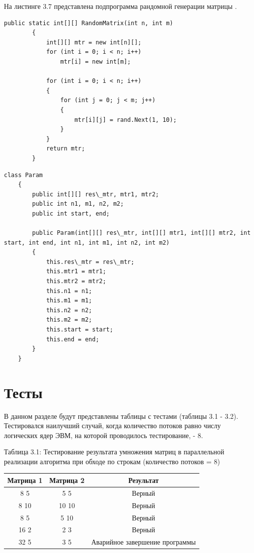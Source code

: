 \documentclass[12pt]{report}
\begin{document}
На листинге 3.7 представлена подпрограмма рандомной генерации матрицы .

\begin{lstlisting}[label=some-code,caption=Подпрограмма создания матрицы с использованием метода Next класса Random \cite{Rand}]
public static int[][] RandomMatrix(int n, int m)
        {
            int[][] mtr = new int[n][];
            for (int i = 0; i < n; i++)
                mtr[i] = new int[m];
          
            for (int i = 0; i < n; i++)
            {
                for (int j = 0; j < m; j++)
                {
                    mtr[i][j] = rand.Next(1, 10);
                }
            }
            return mtr;
        }
\end{lstlisting}

\begin{lstlisting}[label=some-code,caption=класс Param]
class Param
    {
        public int[][] res\_mtr, mtr1, mtr2;
        public int n1, m1, n2, m2;
        public int start, end;

        public Param(int[][] res\_mtr, int[][] mtr1, int[][] mtr2, int start, int end, int n1, int m1, int n2, int m2)
        {
            this.res\_mtr = res\_mtr;
            this.mtr1 = mtr1;
            this.mtr2 = mtr2;
            this.n1 = n1;
            this.m1 = m1;
            this.n2 = n2;
            this.m2 = m2;
            this.start = start;
            this.end = end;
        }
    }
\end{lstlisting}


\section{Тесты}

В данном разделе будут представлены таблицы с тестами (таблицы 3.1 - 3.2). Тестировался наилучший случай, когда количество потоков равно числу логических ядер ЭВМ, на которой проводилось тестирование, - 8.

\begin{center}
	\centering
	\caption{Таблица 3.1: Тестирование результата умножения матриц в параллельной реализации алгоритма при обходе по строкам (количество потоков = 8)}
	\begin{tabular}{|c c c|}
		\hline
		Матрица 1 & Матрица 2 &  Результат \\ [0.5ex] 
 		\hline\hline
		8 5 & 5 5 & Верный\\
 		\hline
 		8 10 & 10 10 & Верный\\
		\hline
		8 5 & 5 10 & Верный\\
 		\hline
 		16 2 & 2 3 & Верный\\
 		\hline
		32 5 & 3 5 & Аварийное завершение программы\\
		\hline
	\end{tabular}
\end{center} 
\end{document}
